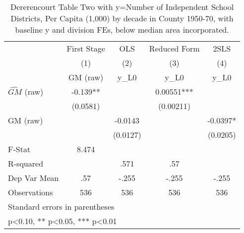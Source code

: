 \begin{table}[htbp]\centering
\def\sym#1{\ifmmode^{#1}\else\(^{#1}\)\fi}
\caption{Dererencourt Table Two with y=Number of Independent School Districts, Per Capita (1,000) by decade in County 1950-70, with baseline y and division FEs, below median area incorporated.}
\begin{tabular}{l*{4}{c}}
\toprule
                    & First Stage   &         OLS   &Reduced Form   &        2SLS   \\
                    &\multicolumn{1}{c}{(1)}&\multicolumn{1}{c}{(2)}&\multicolumn{1}{c}{(3)}&\multicolumn{1}{c}{(4)}\\
                    &\multicolumn{1}{c}{GM  (raw)}&\multicolumn{1}{c}{y\_L0}&\multicolumn{1}{c}{y\_L0}&\multicolumn{1}{c}{y\_L0}\\
\midrule
$\hat{GM}$ (raw)    &      -0.139** &               &     0.00551***&               \\
                    &    (0.0581)   &               &   (0.00211)   &               \\
\addlinespace
GM  (raw)           &               &     -0.0143   &               &     -0.0397*  \\
                    &               &    (0.0127)   &               &    (0.0205)   \\
\midrule
F-Stat              &       8.474   &               &               &               \\
R-squared           &               &        .571   &         .57   &               \\
Dep Var Mean        &         .57   &       -.255   &       -.255   &       -.255   \\
Observations        &         536   &         536   &         536   &         536   \\
\bottomrule
\multicolumn{5}{l}{\footnotesize Standard errors in parentheses}\\
\multicolumn{5}{l}{\footnotesize * p<0.10, ** p<0.05, *** p<0.01}\\
\end{tabular}
\end{table}
